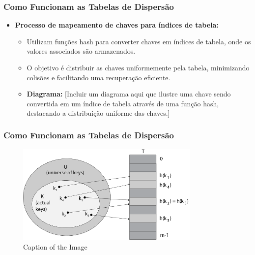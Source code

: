 \begin{frame}[fragile]
  \frametitle{Como Funcionam as Tabelas de Dispersão}
  \begin{itemize}
    \item \textbf{Processo de mapeamento de chaves para índices de tabela:}
      \begin{itemize}
        \item Utilizam funções hash para converter chaves em índices de tabela, onde os valores associados são armazenados.
        \item O objetivo é distribuir as chaves uniformemente pela tabela, minimizando colisões e facilitando uma recuperação eficiente.
        \item \textbf{Diagrama:} [Incluir um diagrama aqui que ilustre uma chave sendo convertida em um índice de tabela através de uma função hash, destacando a distribuição uniforme das chaves.]
      \end{itemize}
    
  \end{itemize}
\end{frame}
\begin{frame}[fragile]
  \frametitle{Como Funcionam as Tabelas de Dispersão}
  \begin{figure}
    \centering
    \includegraphics[width=0.8\textwidth]{aulas/aula2-hash-fig1.png}
    \caption{Caption of the Image}
  \end{figure}
\end{frame}
